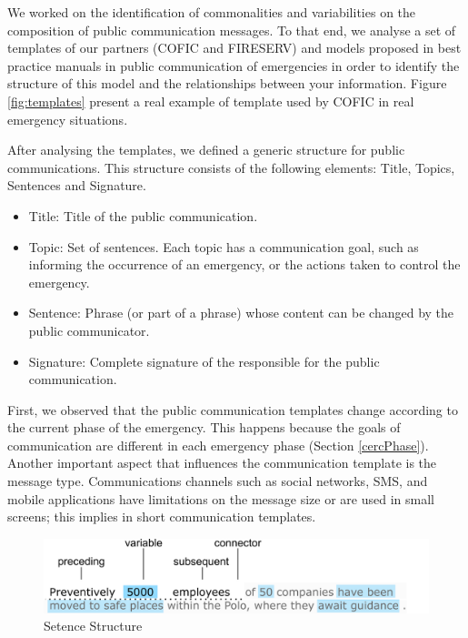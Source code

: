 We worked on the identification of commonalities and variabilities on the composition of public communication messages. To that end, we analyse a set of templates of our partners (COFIC and FIRESERV) and models proposed in best practice manuals \cite{cisvGuide} \cite{certTemplates} \cite{} in public communication of emergencies in order to identify the structure of this model and the relationships between your information. Figure \ref{fig:templates} present a real example of template used by COFIC in real emergency situations.



After analysing the templates, we defined a generic structure for public communications. This structure consists of the following elements: Title, Topics, Sentences and Signature.

\begin{itemize}
   \item Title: Title of the public communication.
   \item Topic: Set of sentences. Each topic has a communication goal, such as informing the occurrence of an emergency, or the actions taken to control the emergency.
   \item Sentence: Phrase (or part of a phrase) whose content can be changed by the public communicator. 
   \item Signature: Complete signature of the responsible for the public communication.

 \end{itemize}
 

 

 
 First, we observed that the public communication templates change according to the current phase of the emergency. This happens because the goals of communication are different in each emergency phase (Section \ref{cercPhase}). Another important aspect that influences the communication template is the message type. Communications channels such as social networks, SMS, and mobile applications have limitations on the message size or are used in small screens; this implies in short communication templates.
 
  \begin{figure}[]
\centering
\includegraphics[width=\linewidth]{images/sentenceStructure}
\caption{Setence Structure}
\label{fig:sentencStructure}
\end{figure}

